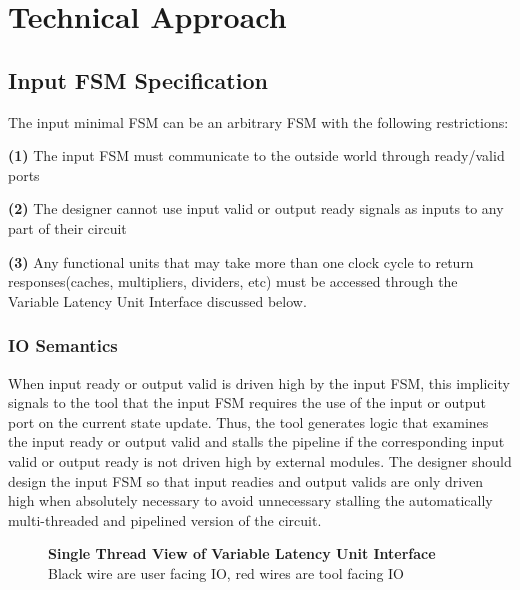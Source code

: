 \section{Technical Approach}
\subsection{Input FSM Specification}
The input minimal FSM can be an arbitrary FSM with the following restrictions:

{\bf (1)} The input FSM must communicate to the outside world through ready/valid ports  

{\bf (2)} The designer cannot use input valid or output ready signals as inputs to any part of their circuit

{\bf (3)} Any functional units that may take more than one clock cycle to return responses(caches, multipliers, dividers, etc) must be accessed through the Variable Latency Unit Interface discussed below.

\subsubsection{IO Semantics}
When input ready or output valid is driven high by the input FSM, this implicity signals to the tool that the input FSM requires the use of the input or output port on the current state update. Thus, the tool generates logic that examines the input ready or output valid and stalls the pipeline if the corresponding input valid or output ready is not driven high by external modules. The designer should design the input FSM so that input readies and output valids are only driven high when absolutely necessary to avoid unnecessary stalling the automatically multi-threaded and pipelined version of the circuit.

\begin{figure}
	\centering
    \caption{{\bf Single Thread View of Variable Latency Unit Interface} Black wire are user facing IO, red wires are tool facing IO}
	\label{fig:VarLatIO}
\end{figure}

